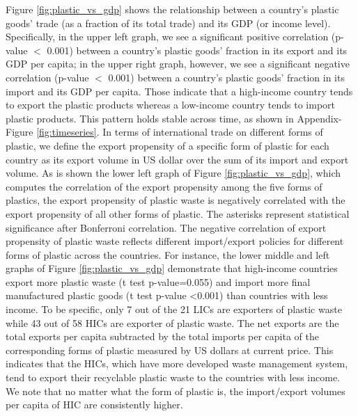 \documentclass[dvipsnames]{article}
\begin{document}
Figure \ref{fig:plastic_vs_gdp} shows the relationship between a country's plastic goods' trade (as a fraction of its total trade) and its GDP (or income level). Specifically, in the upper left graph, we see a significant positive correlation (p-value $<$ 0.001) between a country's plastic goods' fraction in its export and its GDP per capita; in the upper right graph, however, we see a significant negative correlation (p-value $<$ 0.001) between a country's plastic goods' fraction in its import and its GDP per capita. Those indicate that a high-income country tends to export the plastic products whereas a low-income country tends to import plastic products. This pattern holds stable across time, as shown in Appendix-Figure \ref{fig:timeseries}. In terms of international trade on different forms of plastic, we define the export propensity of a specific form of plastic for each country as its export volume in US dollar over the sum of its import and export volume. As is shown the lower left graph of Figure \ref{fig:plastic_vs_gdp}, which computes the correlation of the export propensity among the five forms of plastics, the export propensity of plastic waste is negatively correlated with the export propensity of all other forms of plastic. The asterisks represent statistical significance after Bonferroni correlation. The negative correlation of export propensity of plastic waste reflects different import/export policies for different forms of plastic across the countries. For instance, the lower middle and left graphs of Figure \ref{fig:plastic_vs_gdp} demonstrate that high-income countries export more plastic waste (t test p-value=0.055) and import more final manufactured plastic goods (t test p-value <0.001) than countries with less income. To be specific, only 7 out of the 21 LICs are exporters of plastic waste while 43 out of 58 HICs are exporter of plastic waste. The net exports are the total exports per capita subtracted by the total imports per capita of the corresponding forms of plastic measured by US dollars at current price. This indicates that the HICs, which have more developed waste management system, tend to export their recyclable plastic waste to the countries with less income. We note that no matter what the form of plastic is, the import/export volumes per capita of HIC are consistently higher.
\end{document}
